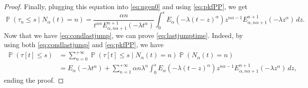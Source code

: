 \documentclass[]{amsart}
\numberwithin{equation}{section}
\theoremstyle{remark}
\theoremstyle{definition}
\DeclareMathOperator{\bP}{\mathbb{P}}
\begin{document}
\begin{proof}
	Finally, plugging this equation into \eqref{eq:ngen0} and using \eqref{eq:pkfPP}, we get
	\begin{equation*}
		\bP(\tau_n \le s \mid N_\alpha(t)=n)=\frac{\alpha n}{t^{\alpha n}E_{\alpha,n\alpha+1}^{n+1}(-\lambda t^\alpha)} \int_0^s E_\alpha(-\lambda (t-z)^\alpha)z^{n\alpha-1}E_{\alpha,n\alpha+1}^{n+1}(-\lambda z^\alpha)\, dz.
	\end{equation*}
	Now that we have \eqref{eq:condlastjump}, we can prove \eqref{eq:lastjumptime}. Indeed, by using both \eqref{eq:condlastjump} and \eqref{eq:pkfPP}, we have
	\begin{align*}
		\bP(\tau[t] \le s)&=\sum_{n=0}^{+\infty}\bP(\tau[t] \le s \mid N_\alpha(t)=n)\bP(N_\alpha(t)=n)\\
		&=E_\alpha(-\lambda t^\alpha)+\sum_{n=1}^{+\infty}\alpha n \lambda^n \int_0^s E_\alpha(-\lambda (t-z)^\alpha)z^{n\alpha-1}E_{\alpha,n\alpha+1}^{n+1}(-\lambda z^\alpha)\, dz,
	\end{align*}
	ending the proof.
\end{proof}

\end{document}
